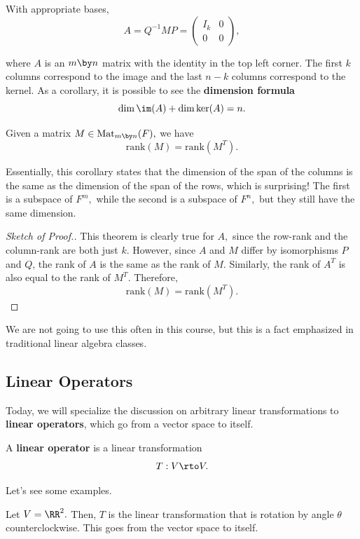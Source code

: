 With appropriate bases, 
\[
A = Q^{-1} M P = \begin{pmatrix} I_k & 0 \\ 0 & 0 \end{pmatrix},
\]

where $A$ is an $m \by n$ matrix with the identity in the top left corner. The first $k$ columns correspond to the image and the last $n - k$ columns correspond to the kernel. As a corollary, it is possible to see the \textbf{dimension formula} \[\dim \im (A) + \dim \ker(A) = n.\]

\begin{corollary}
Given a matrix $M \in \text{Mat}_{m \by n} (F),$ we have \[\text{rank}(M) = \text{rank}(M^T).\]
\end{corollary}

Essentially, this corollary states that the dimension of the span of the columns is the same as the dimension of the span of the rows, which is surprising! The first is a subspace of $F^m,$ while the second is a subspace of $F^n,$ but they still have the same dimension.
\begin{proof}[Sketch of Proof.]
This theorem is clearly true for $A,$ since the row-rank and the column-rank are both just $k$. However, since $A$ and $M$ differ by isomorphisms $P$ and $Q$, the rank of $A$ is the same as the rank of $M.$ Similarly, the rank of $A^T$ is also equal to the rank of $M^T.$ Therefore, \[\text{rank}(M) = \text{rank}(M^T).\]
\end{proof}

We are not going to use this often in this course, but this is a fact emphasized in traditional linear algebra classes. 

\subsection{Linear Operators}

Today, we will specialize the discussion on arbitrary linear transformations to \textbf{linear operators}, which go from a vector space to itself.

\begin{definition}
A \textbf{linear operator} is a linear transformation \[T: V \rto V.\] 
\end{definition}

Let's see some examples.
\begin{example}\label{rotation by theta}
Let $V = \RR^2.$ Then, $T$ is the linear transformation that is rotation by angle $\theta$ counterclockwise. This goes from the vector space to itself.
\end{example}

